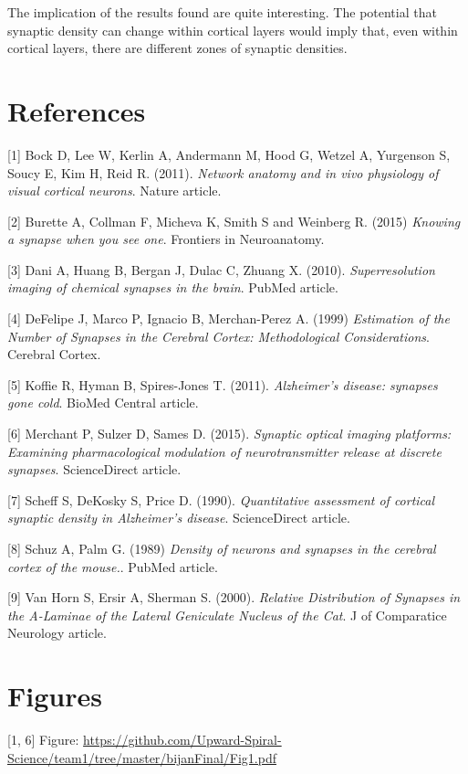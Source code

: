 \documentclass{article}
\begin{document}
The implication of the results found are quite interesting. The potential that synaptic density can change within cortical layers would imply that, even within cortical layers, there are different zones of synaptic densities.

\section{References}

[1] Bock D, Lee W, Kerlin A, Andermann M, Hood G, Wetzel A, Yurgenson S, Soucy E, Kim H, Reid R. (2011). {\it Network anatomy and in vivo physiology of visual cortical neurons}. Nature article.

[2] Burette A, Collman F, Micheva K, Smith S and Weinberg R. (2015) {\it Knowing a synapse when you see one}. Frontiers in Neuroanatomy.

[3] Dani A, Huang B, Bergan J, Dulac C, Zhuang X. (2010). {\it Superresolution imaging of chemical synapses in the brain}. PubMed article.

[4] DeFelipe J, Marco P, Ignacio B, Merchan-Perez A. (1999) {\it Estimation of the Number of Synapses in the Cerebral Cortex: Methodological Considerations}. Cerebral Cortex.

[5] Koffie R, Hyman B, Spires-Jones T. (2011). {\it Alzheimer's disease: synapses gone cold}. BioMed Central article.

[6] Merchant P, Sulzer D, Sames D. (2015). {\it Synaptic optical imaging platforms: Examining pharmacological modulation of neurotransmitter release at discrete synapses}. ScienceDirect article.

[7] Scheff S, DeKosky S, Price D. (1990). {\it Quantitative assessment of cortical synaptic density in Alzheimer's disease}. ScienceDirect article.

[8] Schuz A, Palm G. (1989) {\it Density of neurons and synapses in the cerebral cortex of the mouse.}. PubMed article.

[9] Van Horn S, Ersir A, Sherman S. (2000). {\it Relative Distribution of Synapses in the
A-Laminae of the Lateral Geniculate
Nucleus of the Cat}. J of Comparatice Neurology article.

\section{Figures}

[1, 6] Figure:
{\tiny \url{https://github.com/Upward-Spiral-Science/team1/tree/master/bijanFinal/Fig1.pdf}}
\end{document}
